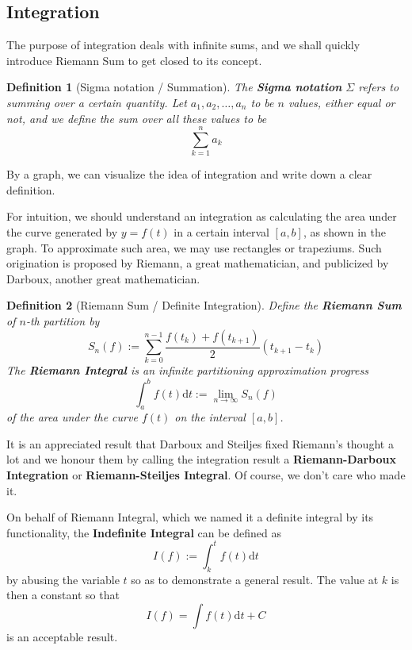 \documentclass[12pt]{article}
\renewcommand{\d}[1]{\mathrm{d}{#1}}
\newtheorem{definition}{Definition}[section]
\begin{document}
    \subsection*{Integration}

    The purpose of integration deals with infinite sums, and we shall quickly introduce Riemann Sum to get closed to its concept.

    \begin{definition}[Sigma notation / Summation]
        The \textbf{Sigma notation} $\Sigma$ refers to summing over a certain quantity. Let $a_1,a_2,\dots,a_n$ to be $n$ values, either equal or not, and we define the sum over all these values to be \[\sum_{k=1}^{n}a_k\]
    \end{definition}

    By a graph, we can visualize the idea of integration and write down a clear definition.



    For intuition, we should understand an integration as calculating the area under the curve generated by $y=f(t)$ in a certain interval $[a,b]$, as shown in the graph. To approximate such area, we may use rectangles or trapeziums. Such origination is proposed by Riemann, a great mathematician, and publicized by Darboux, another great mathematician.

    \begin{definition}[Riemann Sum / Definite Integration]
        Define the \textbf{Riemann Sum} of $n$-th partition by \[S_n(f):=\sum_{k=0}^{n-1} \frac{f(t_k)+f(t_{k+1})}{2}(t_{k+1}-t_k)\] The \textbf{Riemann Integral} is an infinite partitioning approximation progress \[\int_a^b f(t) \d{t} := \lim_{n\to \infty}S_n(f)\] of the area under the curve $f(t)$ on the interval $[a,b]$.
    \end{definition}

    It is an appreciated result that Darboux and Steiljes fixed Riemann's thought a lot and we honour them by calling the integration result a \textbf{Riemann-Darboux Integration} or \textbf{Riemann-Steiljes Integral}. Of course, we don't care who made it.

    On behalf of Riemann Integral, which we named it a definite integral by its functionality, the \textbf{Indefinite Integral} can be defined as \[I(f):= \int_{k}^{t} f(t) \d{t}\] by abusing the variable $t$ so as to demonstrate a general result. The value at $k$ is then a constant so that \[I(f)=\int f(t) \d{t} + C\] is an acceptable result.
\end{document}

